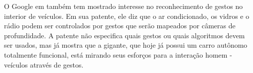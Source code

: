 O Google em \cite{hobbs2012gesture} também tem mostrado interesse no reconhecimento de gestos no interior de veículos. Em sua patente, ele diz que o ar condicionado, os vidros e o rádio podem ser controlados por gestos que serão mapeados por câmeras de profundidade. A patente não especifica quais gestos ou quais algoritmos devem ser usados, mas já mostra que a gigante, que hoje já possui um carro autônomo totalmente funcional, está mirando seus esforços para a interação homem - veículos através de gestos.